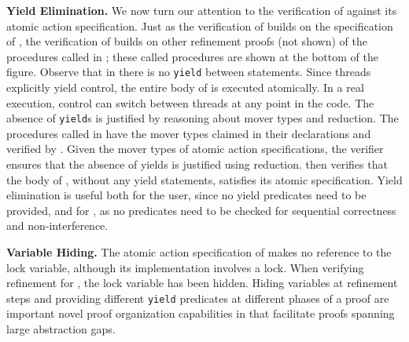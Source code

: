{\bf Yield Elimination.} 
We now turn our attention to the verification of  against
its atomic action specification.
Just as the verification of  builds on the specification of ,
the verification of  builds on other refinement proofs (not shown) 
of the procedures called in ;
these called procedures are shown at the bottom of the figure. 
Observe that in  there is no {\tt yield} between
statements. Since threads explicitly yield control, the
entire body of  is executed atomically. In
a real execution, control can switch between threads at any point in
the code. The absence of {\tt yield}s is justified by reasoning about
mover types and reduction. The procedures called in
 have the mover types claimed in their
declarations and verified by \civl. Given the mover types of 
atomic action specifications, the \civl verifier ensures
that the absence of yields is justified using reduction.  \civl
then verifies that the body of , without any yield statements, satisfies
its atomic specification. Yield elimination is useful both for the
user, since no yield predicates need to be provided, and for \civl,
as no predicates need to be checked for sequential correctness and
non-interference.

{\bf Variable Hiding.} The atomic action specification of 
makes no reference to the lock variable, although its implementation
involves a lock. When verifying refinement for , the lock
variable has been hidden. Hiding variables at refinement steps and
providing different {\tt yield} predicates at different phases of a
proof are important novel proof organization capabilities in \civl
that facilitate proofs spanning large abstraction gaps.


